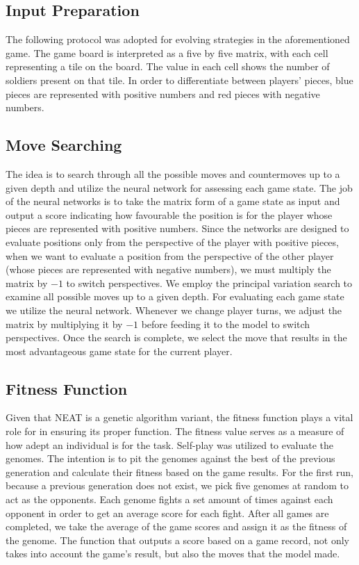 \documentclass[letterpaper, 12pt]{article}
\begin{document}
\subsection*{Input Preparation}
The following protocol was adopted for evolving strategies in the aforementioned game.
The game board is interpreted as a five by five matrix, with each cell representing a
tile on the board. The value in each cell shows the number of soldiers present on that
tile. In order to differentiate between players' pieces, blue pieces are represented with
positive numbers and red pieces with negative numbers.

\subsection*{Move Searching} 
The idea is to search through all the possible moves and countermoves up to a given
depth and utilize the neural network for assessing each game state. The job of the
neural networks is to take the matrix form of a game state as input and output a score
indicating how favourable the position is for the player whose pieces are represented
with positive numbers. Since the networks are designed to evaluate positions only from
the perspective of the player with positive pieces, when we want to evaluate a position
from the perspective of the other player (whose pieces are represented with negative
numbers), we must multiply the matrix by \(-1\) to switch perspectives. We employ the
principal variation search to examine all possible moves up to a given depth. For
evaluating each game state we utilize the neural network. Whenever we change player
turns, we adjust the matrix by multiplying it by \(-1\) before feeding it to the model
to switch perspectives. Once the search is complete, we select the move that results in
the most advantageous game state for the current player.

\subsection*{Fitness Function}
Given that NEAT is a genetic algorithm variant, the fitness function plays a vital role
for in ensuring its proper function. The fitness value serves as a measure of how adept
an individual is for the task. Self-play was utilized to evaluate the genomes. The
intention is to pit the genomes against the best of the previous generation and
calculate their fitness based on the game results. For the first run, because a previous
generation does not exist, we pick five genomes at random to act as the opponents. Each
genome fights a set amount of times against each opponent in order to get an average
score for each fight. After all games are completed, we take the average of the game
scores and assign it as the fitness of the genome. The function that outputs a score
based on a game record, not only takes into account the game's result, but also the
moves that the model made.
\end{document}
